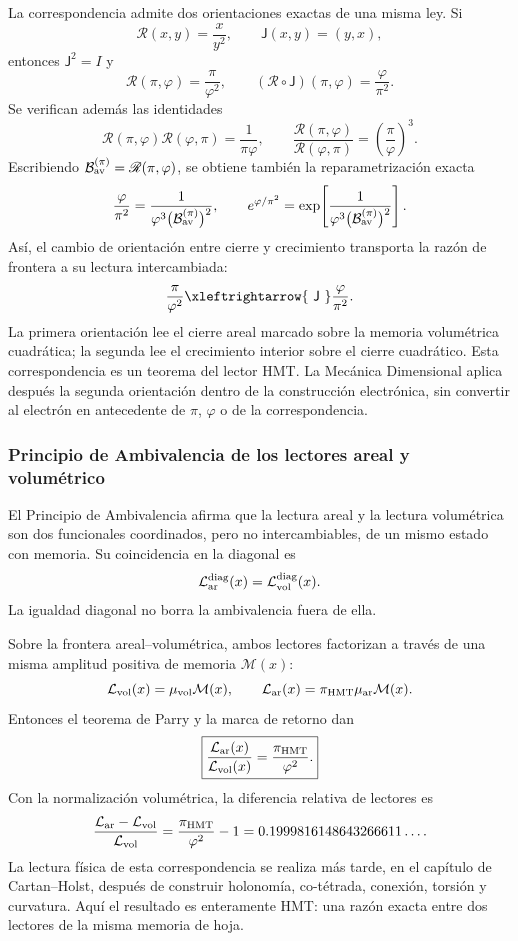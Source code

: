 La correspondencia admite dos orientaciones exactas de una misma ley. Si
\[
 \mathscr R(x,y)=\frac{x}{y^2},
 \qquad
 \mathsf J(x,y)=(y,x),
\]
entonces \(\mathsf J^2=I\) y
\[
 \mathscr R(\pi,\varphi)=\frac{\pi}{\varphi^2},
 \qquad
 (\mathscr R\circ\mathsf J)(\pi,\varphi)
 =\frac{\varphi}{\pi^2}.
\]
Se verifican además las identidades
\[
 \mathscr R(\pi,\varphi)\mathscr R(\varphi,\pi)
 =\frac1{\pi\varphi},
 \qquad
 \frac{\mathscr R(\pi,\varphi)}
 {\mathscr R(\varphi,\pi)}
 =\left(\frac{\pi}{\varphi}\right)^3.
\]
Escribiendo
\(\mathcal B_{\rm av}^{(\pi)}=\mathscr R(\pi,\varphi)\), se obtiene
también la reparametrización exacta
\[
 \frac{\varphi}{\pi^2}
 =
 \frac1{\varphi^3
 \bigl(\mathcal B_{\rm av}^{(\pi)}\bigr)^2},
 \qquad
 e^{\varphi/\pi^2}
 =
 \exp\!\left[
 \frac1{\varphi^3
 \bigl(\mathcal B_{\rm av}^{(\pi)}\bigr)^2}
 \right].
\]
Así, el cambio de orientación entre cierre y crecimiento transporta la
razón de frontera a su lectura intercambiada:
\[
 \frac{\pi}{\varphi^2}
 \xleftrightarrow{\ \mathsf J\ }
 \frac{\varphi}{\pi^2}.
\]
La primera orientación lee el cierre areal marcado sobre la memoria
volumétrica cuadrática; la segunda lee el crecimiento interior sobre el
cierre cuadrático. Esta correspondencia es un teorema del lector HMT. La
Mecánica Dimensional aplica después la segunda orientación dentro de la
construcción electrónica, sin convertir al electrón en antecedente de
\(\pi\), \(\varphi\) o de la correspondencia.

\subsubsection{Principio de Ambivalencia de los lectores areal y volumétrico}
\label{p12-83-c16-s2:sec:ambivalencia-grav-inercial-pi-phi2}

El Principio de Ambivalencia afirma que la lectura areal y la lectura
volumétrica son dos funcionales coordinados, pero no intercambiables, de un
mismo estado con memoria. Su coincidencia en la diagonal es
\[
 \mathcal L_{\rm ar}^{\rm diag}(x)
 =\mathcal L_{\rm vol}^{\rm diag}(x).
\]
La igualdad diagonal no borra la ambivalencia fuera de ella.

Sobre la frontera areal--volumétrica, ambos lectores factorizan a través de
una misma amplitud positiva de memoria \(\mathcal M(x)\):
\[
 \mathcal L_{\rm vol}(x)=\mu_{\rm vol}\mathcal M(x),
 \qquad
 \mathcal L_{\rm ar}(x)=
 \pi_{\rm HMT}\mu_{\rm ar}\mathcal M(x).
\]
Entonces el teorema de Parry y la marca de retorno dan
\[
 \boxed{\displaystyle
 \frac{\mathcal L_{\rm ar}(x)}
 {\mathcal L_{\rm vol}(x)}
 =\frac{\pi_{\rm HMT}}{\varphi^2}.}
\]
Con la normalización volumétrica, la diferencia relativa de lectores es
\[
 \frac{\mathcal L_{\rm ar}-\mathcal L_{\rm vol}}
 {\mathcal L_{\rm vol}}
 =
 \frac{\pi_{\rm HMT}}{\varphi^2}-1
 =
 0.1999816148643266611\ldots.
\]
La lectura física de esta correspondencia se realiza más tarde, en el capítulo de
Cartan--Holst, después de construir holonomía, co-tétrada, conexión, torsión
y curvatura. Aquí el resultado es enteramente HMT: una razón exacta entre
dos lectores de la misma memoria de hoja.

